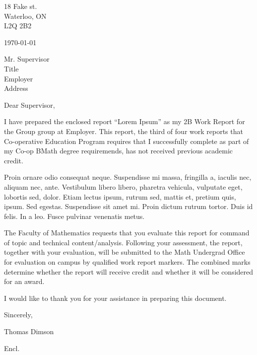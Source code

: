 \documentclass[12pt]{article}
\begin{document}



\begin{waterlooletter}
18 Fake st.\\
Waterloo, ON\\
L2Q 2B2

\today

Mr. Supervisor\\
Title\\
Employer\\
Address

Dear Supervisor,

I have prepared the enclosed report ``Lorem Ipsum'' as my 2B Work Report for the Group group at Employer. This report, the third of four work reports that Co-operative Education Program requires that I successfully complete as part of my Co-op BMath degree requiremends, has not received previous academic credit.

Proin ornare odio consequat neque. Suspendisse mi massa, fringilla a, iaculis nec, aliquam nec, ante. Vestibulum libero libero, pharetra vehicula, vulputate eget, lobortis sed, dolor. Etiam lectus ipsum, rutrum sed, mattis et, pretium quis, ipsum. Sed egestas. Suspendisse sit amet mi. Proin dictum rutrum tortor. Duis id felis. In a leo. Fusce pulvinar venenatis metus.

The Faculty of Mathematics requests that you evaluate this report for command of topic and technical content/analysis. Following your assessment, the report, together with your evaluation, will be submitted to the Math Undergrad Office for evaluation on campus by qualified work report markers. The combined marks determine whether the report will receive credit and whether it will be considered for an award.

I would like to thank you for your assistance in preparing this document.

Sincerely,\\

\vspace{1em}

Thomas Dimson

Encl.
\end{waterlooletter}
\end{document}
